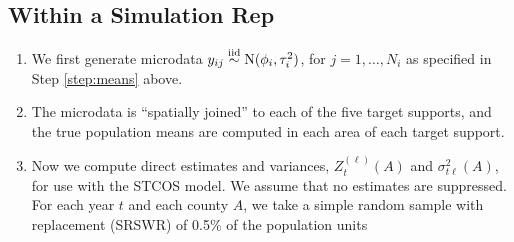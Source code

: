 \documentclass[12pt]{article}
\begin{document}
\subsection{Within a Simulation Rep}
\label{sec:sim-rep}

\begin{enumerate}
\item We first generate microdata $y_{ij} \stackrel{\text{iid}}{\sim} \text{N}(\phi_i, \tau_i^2)$, for $j = 1, \ldots, N_i$ as specified in Step \ref{step:means} above.

\item The microdata is ``spatially joined'' to each of the five target supports, and the true population means are computed in each area of each target support.

\item Now we compute direct estimates and variances, $Z^{(\ell)}_t(A)$ and $\sigma^2_{t\ell}(A)$, for use with the STCOS model. We assume that no estimates are suppressed. For each year $t$ and each county $A$, we take a simple random sample with replacement (SRSWR) of 0.5\% of the population units 


\end{enumerate}
\end{document}
